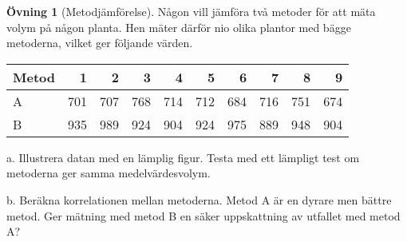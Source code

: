 \documentclass[
]{book}
\theoremstyle{definition}
\theoremstyle{definition}
\theoremstyle{definition}
\newtheorem{exercise}{Övning}[chapter]
\theoremstyle{definition}
\theoremstyle{remark}
\begin{document}
\begin{exercise}[Metodjämförelse]
Någon vill jämföra två metoder för att mäta volym på någon planta. Hen mäter därför nio olika plantor med bägge metoderna, vilket ger följande värden.

\begin{table}
\centering
\begin{tabular}[t]{lrrrrrrrrr}
\toprule
Metod & 1 & 2 & 3 & 4 & 5 & 6 & 7 & 8 & 9\\
\midrule
A & 701 & 707 & 768 & 714 & 712 & 684 & 716 & 751 & 674\\
B & 935 & 989 & 924 & 904 & 924 & 975 & 889 & 948 & 904\\
\bottomrule
\end{tabular}
\end{table}

a. Illustrera datan med en lämplig figur. Testa med ett lämpligt test om metoderna ger samma medelvärdesvolym.

b. Beräkna korrelationen mellan metoderna. Metod A är en dyrare men bättre metod. Ger mätning med metod B en säker uppskattning av utfallet med metod A?
\end{exercise}
\end{document}
